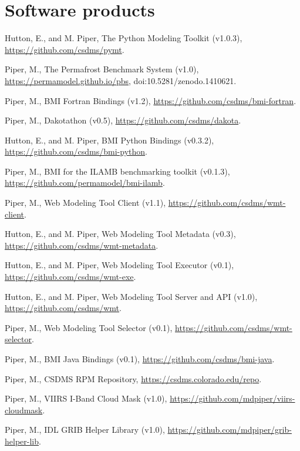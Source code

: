 \section{Software products}
\vspace{0.5em}

\begin{enumerate}[{[}1{]}]

  \item Hutton, E., and M. Piper, The Python Modeling Toolkit
    (v1.0.3), \url{https://github.com/csdms/pymt}.

  \item Piper, M., The Permafrost Benchmark System (v1.0),
    \url{https://permamodel.github.io/pbs},
    {doi:10.5281/zenodo.1410621}.

  \item Piper, M., BMI Fortran Bindings (v1.2),
    \url{https://github.com/csdms/bmi-fortran}.

  \item Piper, M., Dakotathon (v0.5),
    \url{https://github.com/csdms/dakota}.

  \item Hutton, E., and M. Piper, BMI Python Bindings (v0.3.2),
    \url{https://github.com/csdms/bmi-python}.

  \item Piper, M., BMI for the ILAMB benchmarking toolkit (v0.1.3),
    \url{https://github.com/permamodel/bmi-ilamb}.

  \item Piper, M., Web Modeling Tool Client (v1.1),
    \url{https://github.com/csdms/wmt-client}.

  \item Hutton, E., and M. Piper, Web Modeling Tool Metadata (v0.3),
    \url{https://github.com/csdms/wmt-metadata}.

  \item Hutton, E., and M. Piper, Web Modeling Tool Executor (v0.1),
    \url{https://github.com/csdms/wmt-exe}.

  \item Hutton, E., and M. Piper, Web Modeling Tool Server and API (v1.0),
    \url{https://github.com/csdms/wmt}.

  \item Piper, M., Web Modeling Tool Selector (v0.1),
    \url{https://github.com/csdms/wmt-selector}.

  \item Piper, M., BMI Java Bindings (v0.1),
    \url{https://github.com/csdms/bmi-java}.

  \item Piper, M., CSDMS RPM Repository,
    \url{https://csdms.colorado.edu/repo}.

  \item Piper, M., VIIRS I-Band Cloud Mask (v1.0),
    \url{https://github.com/mdpiper/viirs-cloudmask}.

  \item Piper, M., IDL GRIB Helper Library (v1.0),
    \url{https://github.com/mdpiper/grib-helper-lib}.

\end{enumerate}
